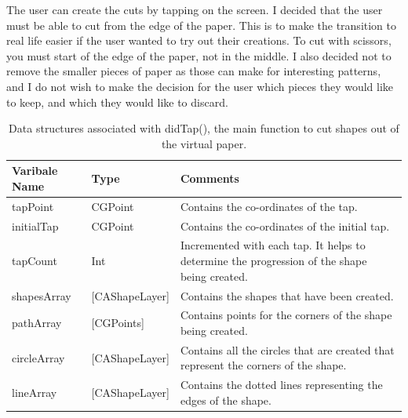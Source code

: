 \documentclass[11pt]{article}
\begin{document}
                 The user can create the cuts by tapping on the screen. I decided that the user must be able to cut from the edge of the paper. This is to make the transition to real life easier if the user wanted to try out their creations. To cut with scissors, you must start of the edge of the paper, not in the middle. I also decided not to remove the smaller pieces of paper as those can make for interesting patterns, and I do not wish to make the decision for the user which pieces they would like to keep, and which they would like to discard.
                 
                 \begin{table}[h!]
                      \begin{center}
                      \caption{Data structures associated with didTap(), the main function to cut shapes out of the virtual paper.}
                      \label{tab:table1}
                        \begin{tabular}{|l|l|p{8cm}|}\hline
                          \textbf{Varibale Name} & \textbf{Type} & \textbf{Comments}\\\hline
                          tapPoint & CGPoint \centering & Contains the co-ordinates of the tap.\\\hline
                          initialTap & CGPoint & Contains the co-ordinates of the initial tap.\\\hline
                          tapCount & Int & Incremented with each tap. It helps to determine the progression of the shape being created.\\\hline
                          shapesArray & [CAShapeLayer] & Contains the shapes that have been created.\\\hline
                          pathArray & [CGPoints] & Contains points for the corners of the shape being created.\\\hline
                          circleArray & [CAShapeLayer] & Contains all the circles that are created that represent the corners of the shape.\\\hline
                          lineArray & [CAShapeLayer] & Contains the dotted lines representing the edges of the shape.\\\hline
                         
                        \end{tabular}
                      \end{center}
                    \end{table}
                    
\end{document}
